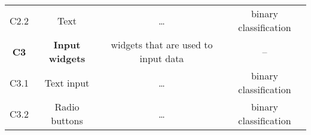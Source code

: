 \begin{table}[]
\begin{tabularx}{\textwidth}{ccCc}
        C2.2            & Text                            & \ldots                                                  & binary classification         \\
        \textbf{C3}     & \textbf{Input widgets}          & widgets that are used to input data                     & –                             \\
        C3.1            & Text input                      & \ldots                                                  & binary classification         \\
        C3.2            & Radio buttons                   & \ldots                                                  & binary classification         \\ \bottomrule
    \end{tabularx}
\end{table}
